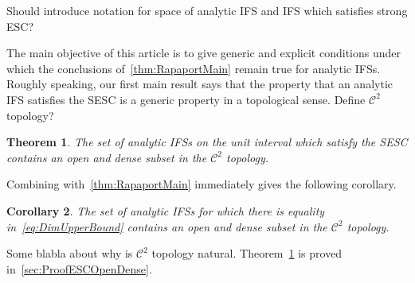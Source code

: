 \documentclass[12pt,]{article}
\newtheorem{theorem}{Theorem}[section]
\newtheorem{corollary}[theorem]{Corollary}
\theoremstyle{definition}
\theoremstyle{remark}
\newcommand{\0}{\mathbf{0}}
\begin{document}
{ {\color{red} Should introduce notation for space of analytic IFS and IFS which satisfies strong ESC?}
 
The main objective of this article is to give generic and explicit conditions under which the conclusions of~\cref{thm:RapaportMain} remain true for analytic IFSs. Roughly speaking, our first main result says that the property that an analytic IFS satisfies the SESC is a generic property in a topological sense. {\color{red} Define $\mathcal{C}^2$ topology?}

\begin{theorem}\label{thm:ESCOpenDense}
The set of analytic IFSs on the unit interval which satisfy the SESC contains an open and dense subset in the $\mathcal{C}^2$ topology. 
\end{theorem}

Combining with~\cref{thm:RapaportMain} immediately gives the following corollary.

\begin{corollary}
The set of analytic IFSs for which there is equality in~\cref{eq:DimUpperBound} contains an open and dense subset in the $\mathcal{C}^2$ topology.
\end{corollary}

{\color{red} Some blabla about why is $\mathcal{C}^2$ topology natural.}
Theorem~\ref{thm:ESCOpenDense} is proved in~\cref{sec:ProofESCOpenDense}.

}
\end{document}
